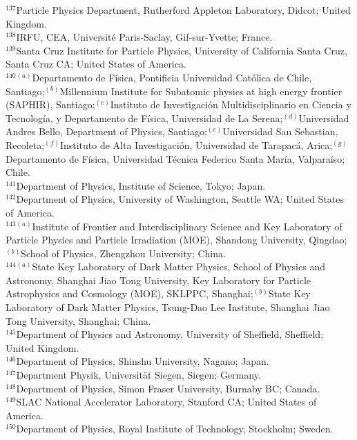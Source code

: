 \documentclass[PAPER, atlasdraft=false, USenglish, cernpreprint]{atlasdoc}
\begin{document}
\begin{flushleft}
$^{137}$Particle Physics Department, Rutherford Appleton Laboratory, Didcot; United Kingdom.\\
$^{138}$IRFU, CEA, Universit\'e Paris-Saclay, Gif-sur-Yvette; France.\\
$^{139}$Santa Cruz Institute for Particle Physics, University of California Santa Cruz, Santa Cruz CA; United States of America.\\
$^{140}$$^{(a)}$Departamento de F\'isica, Pontificia Universidad Cat\'olica de Chile, Santiago;$^{(b)}$Millennium Institute for Subatomic physics at high energy frontier (SAPHIR), Santiago;$^{(c)}$Instituto de Investigaci\'on Multidisciplinario en Ciencia y Tecnolog\'ia, y Departamento de F\'isica, Universidad de La Serena;$^{(d)}$Universidad Andres Bello, Department of Physics, Santiago;$^{(e)}$Universidad San Sebastian, Recoleta;$^{(f)}$Instituto de Alta Investigaci\'on, Universidad de Tarapac\'a, Arica;$^{(g)}$Departamento de F\'isica, Universidad T\'ecnica Federico Santa Mar\'ia, Valpara\'iso; Chile.\\
$^{141}$Department of Physics, Institute of Science, Tokyo; Japan.\\
$^{142}$Department of Physics, University of Washington, Seattle WA; United States of America.\\
$^{143}$$^{(a)}$Institute of Frontier and Interdisciplinary Science and Key Laboratory of Particle Physics and Particle Irradiation (MOE), Shandong University, Qingdao;$^{(b)}$School of Physics, Zhengzhou University; China.\\
$^{144}$$^{(a)}$State Key Laboratory of Dark Matter Physics, School of Physics and Astronomy, Shanghai Jiao Tong University, Key Laboratory for Particle Astrophysics and Cosmology (MOE), SKLPPC, Shanghai;$^{(b)}$State Key Laboratory of Dark Matter Physics, Tsung-Dao Lee Institute, Shanghai Jiao Tong University, Shanghai; China.\\
$^{145}$Department of Physics and Astronomy, University of Sheffield, Sheffield; United Kingdom.\\
$^{146}$Department of Physics, Shinshu University, Nagano; Japan.\\
$^{147}$Department Physik, Universit\"{a}t Siegen, Siegen; Germany.\\
$^{148}$Department of Physics, Simon Fraser University, Burnaby BC; Canada.\\
$^{149}$SLAC National Accelerator Laboratory, Stanford CA; United States of America.\\
$^{150}$Department of Physics, Royal Institute of Technology, Stockholm; Sweden.\\
$$
\end{flushleft}
\end{document}
